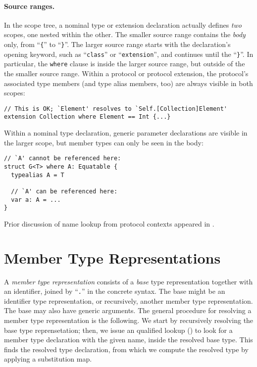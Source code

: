 \documentclass[../generics]{subfiles}
\begin{document}
\paragraph{Source ranges.}
In the scope tree, a nominal type or extension declaration actually defines \emph{two} scopes, one nested within the other. The smaller source range contains the \emph{body} only, from ``\verb|{|'' to ``\verb|}|''. The larger source range starts with the declaration's opening keyword, such as ``\texttt{class}'' or ``\texttt{extension}'', and continues until the ``\verb|}|''. In particular, the \texttt{where} clause is inside the larger source range, but outside of the the smaller source range. Within a protocol or protocol extension, the protocol's associated type members (and type alias members, too) are always visible in both scopes:
\begin{Verbatim}
// This is OK; `Element' resolves to `Self.[Collection]Element'
extension Collection where Element == Int {...}
\end{Verbatim}
Within a nominal type declaration, generic parameter declarations are visible in the larger scope, but member types can only be seen in the body:
\begin{Verbatim}
// `A' cannot be referenced here:
struct G<T> where A: Equatable {  
  typealias A = T

  // `A' can be referenced here:
  var a: A = ...
}
\end{Verbatim}
Prior discussion of name lookup from protocol contexts appeared in .

\section{Member Type Representations}\label{member type repr}

A \emph{member type representation} consists of a \emph{base} type representation together with an identifier, joined by ``\verb|.|'' in the concrete syntax. The base might be an identifier type representation, or recursively, another member type representation. The base may also have generic arguments. The general procedure for resolving a member type representation is the following. We start by recursively resolving the base type reprensetation; then, we issue an qualified lookup () to look for a member type declaration with the given name, inside the resolved base type. This finds the resolved type declaration, from which we compute the resolved type by applying a substitution map.
\end{document}
